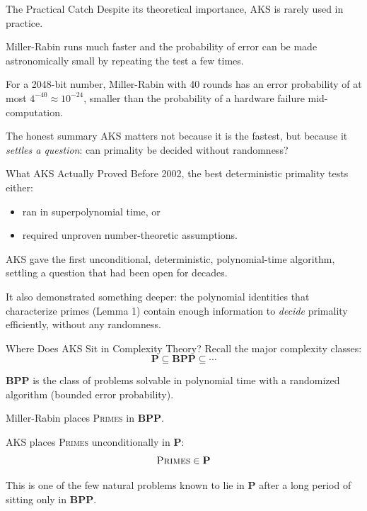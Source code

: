 \documentclass{beamer}
\begin{document}

\begin{frame}{The Practical Catch}
Despite its theoretical importance, AKS is rarely used in practice.

Miller-Rabin runs much faster and the probability of error can be
made astronomically small by repeating the test a few times.

For a 2048-bit number, Miller-Rabin with 40 rounds has an error
probability of at most $4^{-40} \approx 10^{-24}$, smaller than
the probability of a hardware failure mid-computation.

\begin{block}{The honest summary}
AKS matters not because it is the fastest, but because it
\emph{settles a question}: can primality be decided without randomness?
\end{block}
\end{frame}


\begin{frame}{What AKS Actually Proved}
Before 2002, the best deterministic primality tests either:
\begin{itemize}
    \item ran in superpolynomial time, or
    \item required unproven number-theoretic assumptions.
\end{itemize}

AKS gave the first unconditional, deterministic, polynomial-time
algorithm, settling a question that had been open for decades.

It also demonstrated something deeper: the polynomial identities
that characterize primes (Lemma 1) contain enough information
to \emph{decide} primality efficiently, without any randomness.
\end{frame}


\begin{frame}{Where Does AKS Sit in Complexity Theory?}
Recall the major complexity classes:
\[
    \textbf{P} \subseteq \textbf{BPP} \subseteq \cdots
\]
\vspace{0.5em}

\textbf{BPP} is the class of problems solvable in polynomial time
with a randomized algorithm (bounded error probability).

Miller-Rabin places \textsc{Primes} in \textbf{BPP}.

AKS places \textsc{Primes} unconditionally in \textbf{P}:
\[
    \textsc{Primes} \in \mathbf{P}
\]
\vspace{0.5em}

This is one of the few natural problems known to lie in \textbf{P}
after a long period of sitting only in \textbf{BPP}.
\end{frame}
\end{document}
